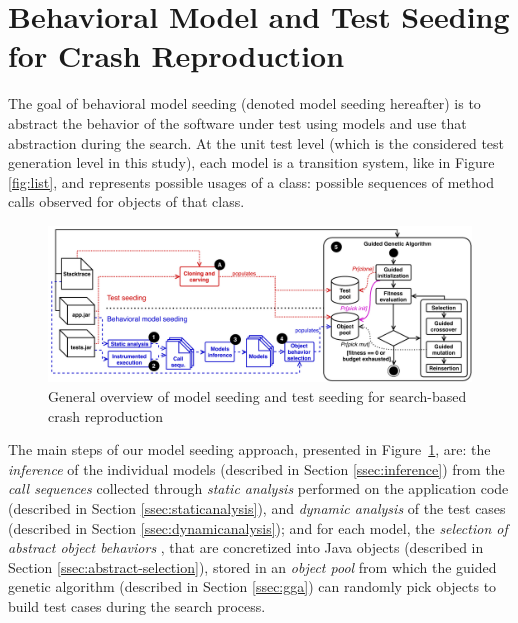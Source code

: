 
 \section{Behavioral Model and Test Seeding for Crash Reproduction}
 \label{sec:model_seeding:approach}

The goal of behavioral model seeding (denoted model seeding hereafter) is to abstract the behavior of the software under test using models and use that abstraction during the search. At the unit test level (which is the considered test generation level in this study), each model is a transition system, like in Figure \ref{fig:list}, and represents possible usages of a class: \ie possible sequences of method calls observed for objects of that class.

\begin{figure}[t]
    \centering
    \includegraphics[width=\textwidth]{papers/model_seeding/figures/implementation/approach.pdf}
    \caption{General overview of model seeding and test seeding for search-based crash reproduction}
    \label{fig:approach}
\end{figure}

The main steps of our model seeding approach, presented in Figure~\ref{fig:approach}, are:
 the \emph{inference} of the individual models  (described in Section \ref{ssec:inference}) from the \emph{call sequences} collected through \emph{static analysis}  performed on the application code (described in Section \ref{ssec:staticanalysis}), and \emph{dynamic analysis}  of the test cases (described in Section \ref{ssec:dynamicanalysis});
 and for each model, the \emph{selection of abstract object behaviors} , that are concretized into Java objects  (described in Section \ref{ssec:abstract-selection}), stored in an \emph{object pool} from which the guided genetic algorithm   (described in Section \ref{ssec:gga}) can randomly pick objects to build test cases during the search process.


